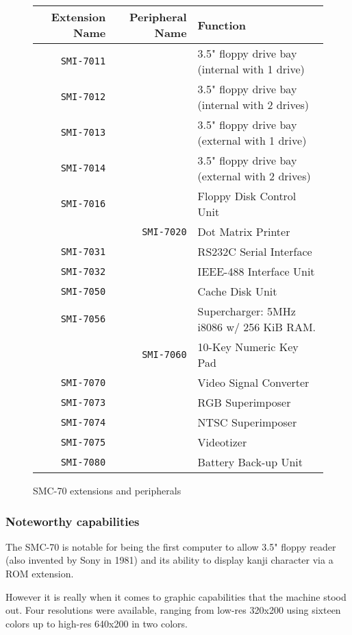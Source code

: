 \begin{figure}[H]

\begin{tabularx}{\textwidth}{rrX} 
  \toprule 
  \textbf{Extension Name} & \textbf{Peripheral Name} & \textbf{Function} \\               
  \toprule    
\texttt{SMI-7011} & & 3.5" floppy drive bay (internal with 1 drive)\\ 
\texttt{SMI-7012} & & 3.5" floppy drive bay (internal with 2 drives)\\ 
\texttt{SMI-7013} & & 3.5" floppy drive bay (external with 1 drive)\\ 
\texttt{SMI-7014} & & 3.5" floppy drive bay (external with 2 drives)\\ 
\texttt{SMI-7016} & & Floppy Disk Control Unit\\ 
 & \texttt{SMI-7020} & Dot Matrix Printer\\ 
\texttt{SMI-7031} & & RS232C Serial Interface\\ 
\texttt{SMI-7032} & & IEEE-488 Interface Unit\\ 
\texttt{SMI-7050} & & Cache Disk Unit\\ 
\texttt{SMI-7056} & & Supercharger: 5MHz i8086 w/ 256 KiB RAM.\\ 
 & \texttt{SMI-7060} & 10-Key Numeric Key Pad\\ 
\texttt{SMI-7070} & & Video Signal Converter\\ 
\texttt{SMI-7073} & & RGB Superimposer\\ 
\texttt{SMI-7074} & & NTSC Superimposer\\ 
\texttt{SMI-7075} & & Videotizer\\ 
\texttt{SMI-7080} & & Battery Back-up Unit\\ 
\toprule
\end{tabularx}%
\caption*{SMC-70 extensions and peripherals\cite{smc70tech}}
\end{figure}


\subsubsection{Noteworthy capabilities}
The SMC-70 is notable for being the first computer to allow 3.5" floppy reader (also invented by Sony in 1981) and its ability to display kanji character via a ROM extension. 

However it is really when it comes to graphic capabilities that the machine stood out. Four resolutions were available, ranging from low-res 320x200 using sixteen colors up to high-res 640x200 in two colors. 

